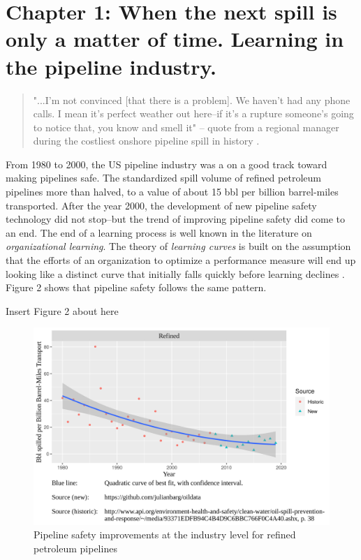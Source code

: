 \section{Chapter 1: When the next spill is only a matter of time. Learning in the pipeline industry.}

\begin{singlespace}
	\begin{quote}
		"...I'm not convinced [that there is a problem]. We haven't had any phone calls. I mean it's perfect weather out here--if it's a rupture someone's going to notice that, you know and smell it" -- quote from a regional manager during the costliest onshore pipeline spill in history \citet[p. 100]{NTSB2012}.
	\end{quote}
\end{singlespace}

From 1980 to 2000, the US pipeline industry was a on a good track toward making pipelines safe. The standardized spill volume of refined petroleum pipelines more than halved, to a value of about 15 bbl per billion barrel-miles transported. After the year 2000, the development of new pipeline safety technology did not stop--but the trend of improving pipeline safety did come to an end. The end of a learning process is well known in the literature on \textit{organizational learning}. The theory of \textit{learning curves} is built on the assumption that the efforts of an organization to optimize a performance measure will end up looking like a distinct curve that initially falls quickly before learning declines \citep{Argote2013-1}. Figure 2 shows that pipeline safety follows the same pattern.

{\noindent}\dotfill

\centerline{Insert Figure 2 about here}

{\noindent}\dotfill

\begin{figure}
	\caption{Pipeline safety improvements at the industry level for refined petroleum pipelines}
	\centerline{\includegraphics{../illustrations/population_learning_5.png}}
\end{figure}

